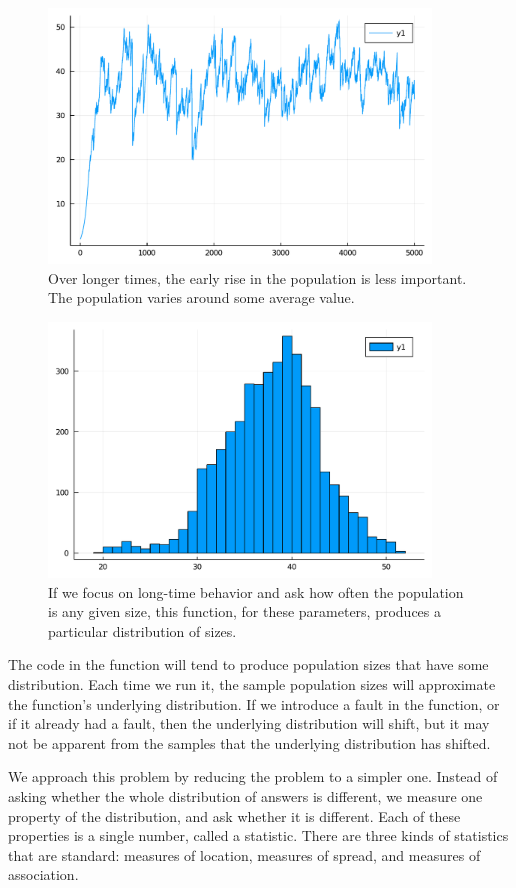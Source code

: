 \documentclass[fleqn,10pt]{olplainarticle}
\begin{document}
\begin{figure}
\centering\includegraphics[width=4in]{insects_long.pdf}
\caption{Over longer times, the early rise in the population
is less important. The population varies around some average value.\label{fig:insectlong}}
\end{figure}
\begin{figure}
\centering\includegraphics[width=4in]{insects_histogram_4k.pdf}
\caption{If we focus on long-time behavior and ask how often
the population is any given size, this function, for these
parameters, produces a particular distribution of sizes.\label{fig:insecthist}}
\end{figure}

The code in the function will tend to produce population sizes
that have some distribution. Each time we run it, the sample
population sizes will approximate the function's underlying
distribution. If we introduce a fault in the function, or if
it already had a fault, then the underlying distribution will shift,
but it may not be apparent from the samples that the underlying distribution
has shifted.

We approach this problem by reducing the problem to a simpler one.
Instead of asking whether the whole distribution of answers is different,
we measure one property of the distribution, and ask whether it is different.
Each of these properties is a single number, called a statistic.
There are three kinds of statistics that are standard: measures of
location, measures of spread, and measures of association.
\end{document}
